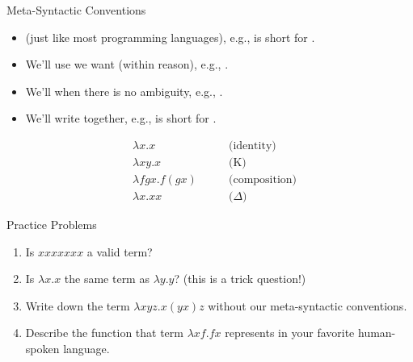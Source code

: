 \documentclass[10pt]{beamer}
\begin{document}
\begin{frame}{Meta-Syntactic Conventions}

\begin{itemize}
\item {} (just like most programming languages), e.g.,  is short for .

\item We'll use  we want (within reason), e.g., .

\item We'll  when there is no ambiguity, e.g., .

\item We'll write  together, e.g.,  is short for .
\end{itemize}

\begin{align*}
&\lambda x . x &\qquad \text{(identity)} \\
&\lambda x y . x &\qquad \text{(K)}\\
&\lambda f g x . f (g x) &\qquad \text{(composition)} \\
&\lambda x . x x &\qquad \text{($\Delta$)}
\end{align*}
\end{frame}


%
%
%
%

\begin{frame}{Practice Problems}

\begin{enumerate}
\item Is $xxxxxxx$ a valid term?
\item Is $\lambda x . x$ the same term as $\lambda y . y$? (this is a trick question!)
\item Write down the term $\lambda xyz . x(yx)z$ without our meta-syntactic conventions.
\item Describe the function that term $\lambda x f . f x$ represents in your favorite human-spoken language.
\end{enumerate}

\end{frame}
\end{document}
